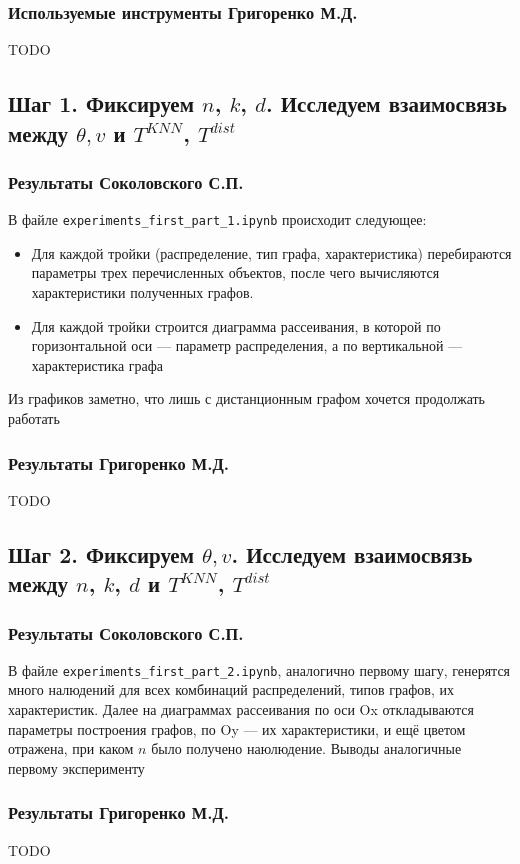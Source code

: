 \documentclass[a4paper,12pt]{article}
\begin{document}
\subsubsection*{Используемые инструменты Григоренко М.Д.}
TODO
\subsection{Шаг 1. Фиксируем $n$, $k$, $d$. Исследуем взаимосвязь между $\theta, v$ и $T^{KNN}$, $T^{dist}$}
\subsubsection*{Результаты Соколовского С.П.}
В файле \texttt{experiments\_first\_part\_1.ipynb} происходит следующее:
\begin{itemize}
    \item Для каждой тройки (распределение, тип графа, характеристика) перебираются параметры трех перечисленных объектов, после чего вычисляются характеристики полученных графов.
    \item Для каждой тройки строится диаграмма рассеивания, в которой по горизонтальной оси --- параметр распределения, а по вертикальной --- характеристика графа
\end{itemize}
Из графиков заметно, что лишь с дистанционным графом хочется продолжать работать
\subsubsection*{Результаты Григоренко М.Д.}
TODO
\subsection{Шаг 2. Фиксируем $\theta, v$. Исследуем взаимосвязь между $n$, $k$, $d$ и $T^{KNN}$, $T^{dist}$}
\subsubsection*{Результаты Соколовского С.П.}
В файле \texttt{experiments\_first\_part\_2.ipynb}, аналогично первому шагу, генерятся много налюдений для всех комбинаций распределений, типов графов, их характеристик. Далее на диаграммах рассеивания по оси Ox откладываются параметры построения графов, по Oy --- их характеристики, и ещё цветом отражена, при каком $n$ было получено наюлюдение. Выводы аналогичные первому эксперименту
\subsubsection*{Результаты Григоренко М.Д.}
TODO
\end{document}
